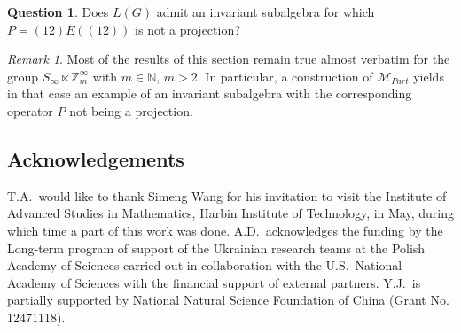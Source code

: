\documentclass[11pt]{amsart}
\newcommand{\N}{\mathbb N}
\newcommand{\Z}{\mathbb Z}
\theoremstyle{plain}
\theoremstyle{definition}
\newtheorem{question}[theorem]{Question}
\theoremstyle{remark}
\newtheorem{remark}[theorem]{Remark}
\numberwithin{equation}{section}
\begin{document}
 \begin{question}
 	Does $L(G)$ admit an invariant subalgebra for which $P=(12)E((12))$ is not a projection?
 \end{question}
 
 

\begin{remark}
Most of the results of this section remain true almost verbatim for the group $S_\infty \ltimes \Z_m^\infty$ with $m \in \N$, $m >2$. In particular, a construction of $\mathcal M_{Part}$ yields in that case an example of an invariant subalgebra with the corresponding operator $P$ not being a projection.
\end{remark}




\subsection*{Acknowledgements} T.A.\ would like to thank Simeng Wang for his invitation to visit the Institute of Advanced Studies in Mathematics, Harbin Institute of Technology, in May, during which time a part of this work was done. 
A.D.\ acknowledges the funding by the Long-term program of support of
the Ukrainian research teams at the Polish Academy of Sciences carried out in collaboration
with the U.S.\ National Academy of Sciences with the financial support of external partners.
Y.J.\ is partially supported by National Natural Science Foundation of China (Grant
No. 12471118). 



\end{document}
